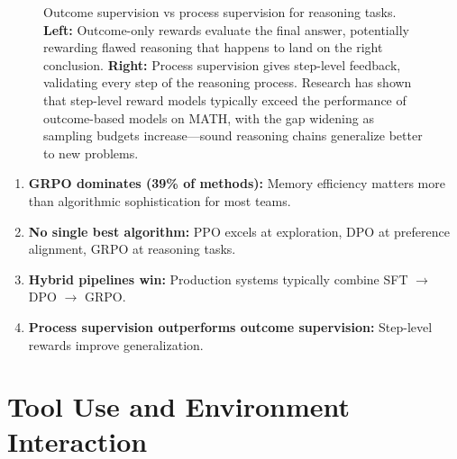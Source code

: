 \documentclass[12pt,a4paper]{report}
\theoremstyle{definition}
\begin{document}
\begin{figure}[htbp]
\caption{Outcome supervision vs process supervision for reasoning tasks. \textbf{Left:} Outcome-only rewards evaluate the final answer, potentially rewarding flawed reasoning that happens to land on the right conclusion. \textbf{Right:} Process supervision gives step-level feedback, validating every step of the reasoning process.
 Research has shown that step-level reward models typically exceed the performance of outcome-based models on MATH, with the gap widening as sampling budgets increase---sound reasoning chains generalize better to new problems.
}
\label{fig:process_supervision}
\end{figure}

\begin{tcolorbox}[colback=blue!5!white, colframe=blue!75!black, title=\textbf{Chapter 2 Key Takeaways}]
\begin{enumerate}
    \item \textbf{GRPO dominates (39\% of methods):} Memory efficiency matters more than algorithmic sophistication for most teams.
    \item \textbf{No single best algorithm:} PPO excels at exploration, DPO at preference alignment, GRPO at reasoning tasks.
    \item \textbf{Hybrid pipelines win:} Production systems typically combine SFT $\rightarrow$ DPO $\rightarrow$ GRPO.
    \item \textbf{Process supervision outperforms outcome supervision:} Step-level rewards improve generalization.
\end{enumerate}
\end{tcolorbox}



\chapter{Tool Use and Environment Interaction}
\label{ch:tooluse}
\end{document}
